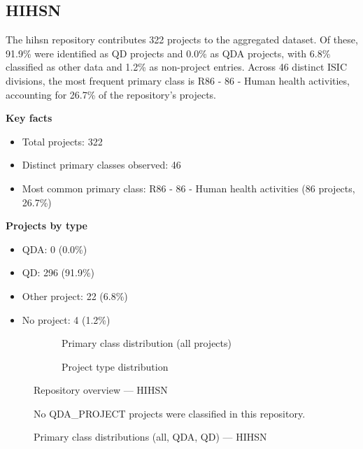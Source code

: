 \clearpage

\subsection{HIHSN}


The hihsn repository contributes 322 projects to the aggregated dataset. Of these, 91.9\% were identified as QD projects and 0.0\% as QDA projects, with 6.8\% classified as other data and 1.2\% as non-project entries. Across 46 distinct ISIC divisions, the most frequent primary class is R86 - 86 - Human health activities, accounting for 26.7\% of the repository's projects.


\textbf{Key facts}

\begin{itemize}
    \item Total projects: 322
    \item Distinct primary classes observed: 46
    \item Most common primary class: R86 - 86 - Human health activities (86 projects, 26.7\%)
\end{itemize}

\textbf{Projects by type}

\begin{itemize}
    \item QDA: 0 (0.0\%)
    \item QD: 296 (91.9\%)
    \item Other project: 22 (6.8\%)
    \item No project: 4 (1.2\%)
\end{itemize}

\begin{figure}[H]
    \centering
    \begin{subfigure}[t]{0.49\textwidth}
        \centering
        
        \caption{Primary class distribution (all projects)}
    \end{subfigure}
    \hfill
    \begin{subfigure}[t]{0.49\textwidth}
        \centering
        
        \caption{Project type distribution}
    \end{subfigure}
    \caption{Repository overview --- HIHSN}
\end{figure}

\clearpage

\begin{figure}[H]
    \centering
    
    \par\vspace{0.8em}
    No QDA\_PROJECT projects were classified in this repository.
    \par\vspace{0.8em}
    
    \caption{Primary class distributions (all, QDA, QD) --- HIHSN}
\end{figure}

